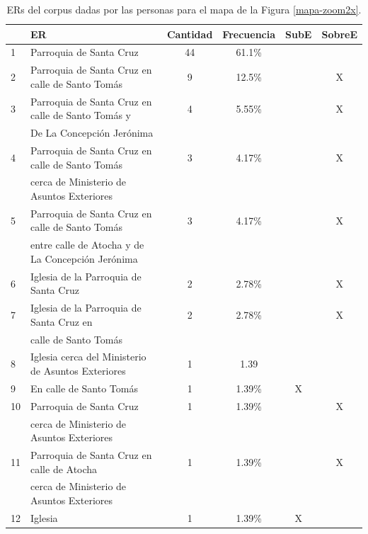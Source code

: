 \begin{table}[H]
{\footnotesize
\begin{center}
\begin{tabular}{|l|l|c|c|c|c|}
\hline
&ER 					      & Cantidad &  Frecuencia & SubE&SobreE \\ \hline \hline
1&Parroquia de Santa Cruz        												 &		44&	61.1\%  &  & \\ \hline
2&Parroquia de Santa Cruz en calle de Santo Tom\'as        &    9 &	12.5\%	& &X\\ \hline
3&Parroquia de Santa Cruz en calle de Santo Tom\'as y      &    4 &     5.55\%      & &X\\
&De La Concepci\'on Jer\'onima                             &      &             & & \\ \hline
4&Parroquia de Santa Cruz en calle de Santo Tom\'as        &    3 &     4.17\%      &&X\\
&cerca de Ministerio de Asuntos Exteriores                 &      &             & &\\  \hline
5&Parroquia de Santa Cruz en calle de Santo Tom\'as        &	3 &	4.17\%	& &X\\
&entre calle de Atocha y de La Concepci\'on Jer\'onima     &	  &			&  &\\  \hline
6&Iglesia de la Parroquia de Santa Cruz			   &	2 &	2.78\%	&&X\\  \hline
7&Iglesia de la Parroquia de Santa Cruz	en      	   &	2 &	2.78\%	&&X\\  
&calle de Santo Tom\'as													 				 &		 &	    &  & \\ \hline
8&Iglesia cerca del Ministerio de Asuntos Exteriores       &	1 &	1.39	&&\\  \hline
9&En calle de Santo Tom\'as                                   &    1 &     1.39\%      &X&\\  \hline

10&Parroquia de Santa Cruz  				   &    1 &	1.39\%	&&X\\  
&cerca de Ministerio de Asuntos Exteriores		   &	  &		&&\\  \hline
11&Parroquia de Santa Cruz en calle de Atocha  		   &	1 &	1.39\%	&&X\\  
&cerca de Ministerio de Asuntos Exteriores		   &	  &		&&\\  \hline
12&Iglesia						   &    1 &	1.39\%	&X&\\  \hline
\end{tabular}
\caption{ERs del corpus dadas por las personas para el mapa de la Figura \ref{mapa-zoom2x}.}\label{freq-mapa-zoom2x}
\end{center}
}
\end{table}

